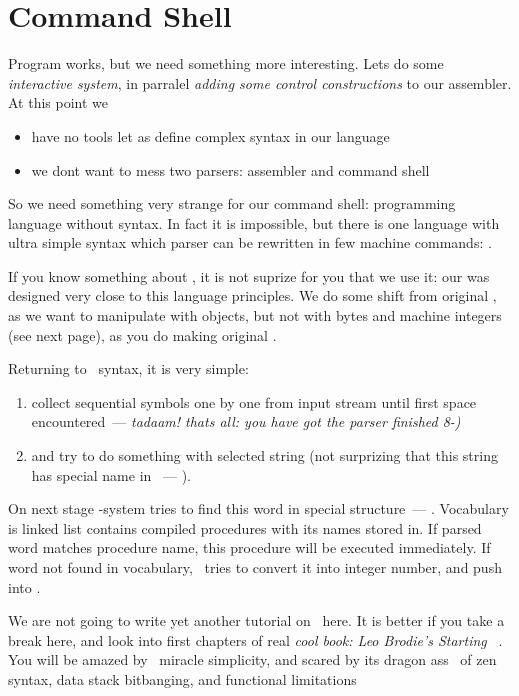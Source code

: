 \section{Command Shell}

Program works, but we need something more interesting. Lets do some
\emph{interactive system}, in parralel \emph{adding some control constructions}
to our assembler. At this point we
\begin{itemize}
	\item have no tools let as define complex syntax in our language
	\item we dont want to mess two parsers: assembler and command shell
\end{itemize}
So we need something very strange for our command shell: programming language
without syntax. In fact it is impossible, but there is one language with ultra
simple syntax which parser can be rewritten in few machine commands: \F.

If you know something about \F, it is not suprize for you that we use it: our
was designed very close to this language principles. We do some shift
from original \F, as we want to manipulate with objects, but not with bytes
and machine integers (see next page), as you do making original
.

\bigskip
Returning to \F\ syntax, it is very simple:
\begin{enumerate}[nosep]
\item collect sequential symbols one by one from input stream until first
space encountered\ --- \emph{tadaam! thats all: you have got the parser 
finished 8-)}
\item and try to do something with selected string (not surprizing that this 
string has special name in \F\ --- ).
\end{enumerate}
On next stage \F-system tries to find this word in special structure\ ---
. Vocabulary is linked list contains compiled procedures
with its names stored in.
If parsed word matches procedure name, this procedure will
be executed immediately. If word not found in vocabulary, \F\ tries to convert
it into integer number, and push into .

\bigskip
We are not going to write yet another tutorial on \F\ here. It is better
if you take a break here, and look into first chapters of real \emph{cool book:
Leo Brodie's Starting \F}\ \cite{starting}. You will be amazed by \F\ miracle
simplicity, and scared by its dragon ass \cite{dragon}\ of zen syntax,
data stack bitbanging, and functional limitations
